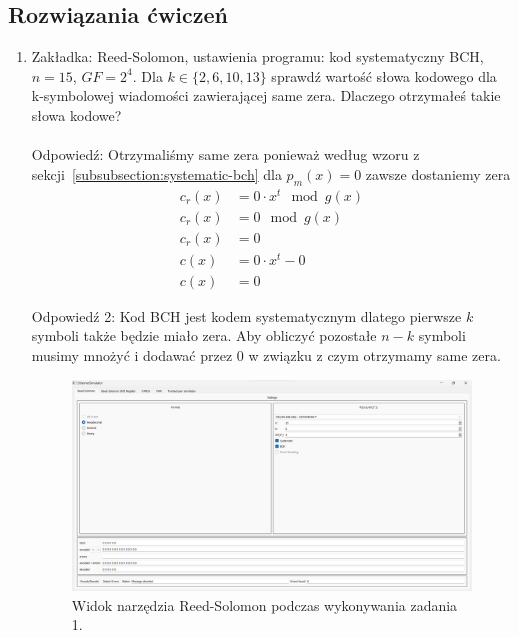 \subsection*{Rozwiązania ćwiczeń}
\begin{enumerate}
    \item Zakładka: Reed-Solomon, ustawienia programu: kod systematyczny BCH, $n=15$, $GF=2^4$.
    Dla $k \in \{ 2, 6, 10, 13 \}$ sprawdź wartość słowa kodowego dla k-symbolowej wiadomości zawierającej same zera. Dlaczego otrzymałeś takie słowa kodowe? \\ \\
    Odpowiedź: Otrzymaliśmy same zera ponieważ według wzoru z sekcji~\ref{subsubsection:systematic-bch} dla $p_m(x) = 0$ zawsze dostaniemy zera
    \begin{align*}
        c_r(x) &= 0 \cdot x^t \mod g(x) \\
        c_r(x) &= 0 \mod g(x) \\
        c_r(x) &= 0 \\
        c(x) &= 0 \cdot x^t - 0 \\
        c(x) &= 0
    \end{align*}

    Odpowiedź 2: Kod BCH jest kodem systematycznym dlatego pierwsze $k$ symboli
    także będzie miało zera. Aby obliczyć pozostałe $n-k$ symboli musimy mnożyć
    i dodawać przez 0 w związku z czym otrzymamy same zera.

    \begin{figure}[H]
        \centering
        \includegraphics[width=\textwidth]{images/rozwiazania_1.png}
        \caption{Widok narzędzia Reed-Solomon podczas wykonywania zadania 1.}
        \label{fig:rozwiazania_1}
    \end{figure}
    

\end{enumerate}
